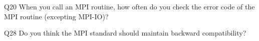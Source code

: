 \begin{description}%
\item{Q20} When you call an MPI routine, how often do you check the error code of the MPI routine  (excepting MPI-IO)?%
\item{Q28} Do you think the MPI standard should maintain backward compatibility?%
\end{description}%
